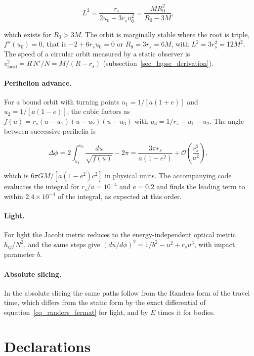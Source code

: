 \documentclass[anonymous]{iopjournal}
\begin{document}
\begin{appendices}
\begin{equation}
    L^2=\frac{r_s}{2u_0-3r_su_0^2}=\frac{MR_0^2}{R_0-3M},
\end{equation}

which exists for $R_0>3M$. The orbit is marginally stable where the root is triple, $f''(u_0)=0$, that is $-2+6r_su_0=0$ or $R_0=3r_s=6M$, with $L^2=3r_s^2=12M^2$. The speed of a circular orbit measured by a static observer is $v_{\mathrm{local}}^2=R\,N'/N=M/(R-r_s)$ (subsection~\ref{sec_lapse_derivation}).

\paragraph{Perihelion advance.} For a bound orbit with turning points $u_1=1/[a(1+e)]$ and $u_2=1/[a(1-e)]$, the cubic factors as $f(u)=r_s(u-u_1)(u-u_2)(u-u_3)$ with $u_3=1/r_s-u_1-u_2$. The angle between successive perihelia is

\begin{equation}
    \Delta\phi=2\int_{u_1}^{u_2}\frac{du}{\sqrt{f(u)}}-2\pi=\frac{3\pi r_s}{a(1-e^2)}+\mathcal{O}\!\left(\frac{r_s^2}{a^2}\right),
\end{equation}

which is $6\pi GM/[a(1-e^2)c^2]$ in physical units. The accompanying code evaluates the integral for $r_s/a=10^{-4}$ and $e=0.2$ and finds the leading term to within $2.4\times10^{-4}$ of the integral, as expected at this order.

\paragraph{Light.} For light the Jacobi metric reduces to the energy-independent optical metric $h_{ij}/N^2$, and the same steps give $(du/d\phi)^2=1/b^2-u^2+r_su^3$, with impact parameter $b$.

\paragraph{Absolute slicing.} In the absolute slicing the same paths follow from the Randers form of the travel time, which differs from the static form by the exact differential of equation~\eqref{eq_randers_fermat} for light, and by $E$ times it for bodies.

\end{appendices}

\section*{Declarations}
\end{document}
